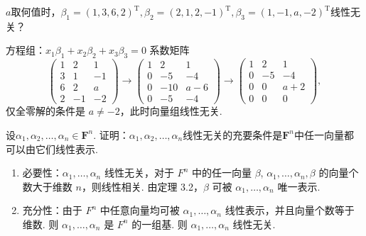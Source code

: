 \begin{exercise}
\begin{exgroup}
        \item $a$取何值时，$\beta_1=(1,3,6,2)^\mathrm{T},\beta_2=(2,1,2,-1)^\mathrm{T},\beta_3=(1,-1,a,-2)^\mathrm{T}$线性无关？
        \begin{answer}
            方程组：$x_1\beta_1+x_2\beta_2+x_3\beta_3=0$ 系数矩阵
            \[\begin{pmatrix}
                    1 & 2  & 1  \\
                    3 & 1  & -1 \\
                    6 & 2  & a  \\
                    2 & -1 &
                    -2\end{pmatrix}\rightarrow\begin{pmatrix}
                    1 & 2   & 1   \\
                    0 & -5  & -4  \\
                    0 & -10 & a-6 \\
                    0 & -5  & -4
                \end{pmatrix}\rightarrow\begin{pmatrix}
                    1 & 2  & 1   \\
                    0 & -5 & -4  \\
                    0 & 0  & a+2 \\
                    0 & 0  & 0
                \end{pmatrix},\]
            仅全零解的条件是 $a\neq-2$，此时向量组线性无关.
        \end{answer}

        \item 设$\alpha_1,\alpha_2,\ldots,\alpha_n\in\mathbf{F}^n$. 证明：$\alpha_1,\alpha_2,\ldots,\alpha_n$线性无关的充要条件是$\mathbf{F}^n$中任一向量都可以由它们线性表示.
        \begin{answer}
            \begin{enumerate}
                \item 必要性：$\alpha_1,\ldots,\alpha_n$ 线性无关，对于 $F^n$ 中的任一向量 $\beta$, $\alpha_1,\ldots,\alpha_n,\beta$ 的向量个数大于维数 $n$，则线性相关. 由定理 3.2，$\beta$ 可被 $\alpha_1,\ldots,\alpha_n$ 唯一表示.

                \item 充分性：由于 $F^n$ 中任意向量均可被 $\alpha_1,\ldots,\alpha_n$ 线性表示，并且向量个数等于维数. 则 $\alpha_1,\ldots,\alpha_n$ 是 $F^n$ 的一组基. 则 $\alpha_1,\ldots,\alpha_n$ 线性无关.


\end{enumerate}
\end{answer}
\end{exgroup}
\end{exercise}
